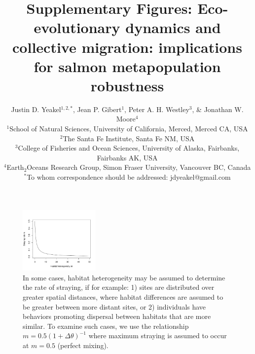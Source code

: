 \documentclass{revtex4}
\newcommand{\beginsupplement}{%
        \clearpage
        \setcounter{table}{0}
        \renewcommand{\thetable}{S\arabic{table}}%
        \setcounter{figure}{0}
        \renewcommand{\thefigure}{S\arabic{figure}}%
     }
\begin{document}
\title{Supplementary Figures: Eco-evolutionary dynamics and collective migration: implications for salmon metapopulation robustness}
\author{
Justin D. Yeakel${}^{1,2,*}$, Jean P. Gibert${}^{1}$, Peter A. H. Westley${}^{3}$, \& Jonathan W. Moore${}^{4}$ \\
${}^1$School of Natural Sciences, University of California, Merced, Merced CA, USA \\
${}^2$The Santa Fe Institute, Santa Fe NM, USA \\
${}^3$College of Fisheries and Ocean Sciences, University of Alaska, Fairbanks, Fairbanks AK, USA \\
${}^4$Earth${}_2$Oceans Research Group, Simon Fraser University, Vancouver BC, Canada \\
${}^*$To whom correspondence should be addressed: jdyeakel@gmail.com
}

\maketitle

\beginsupplement




\begin{figure}
  \captionsetup{justification=raggedright,
singlelinecheck=false
}
\centering
\includegraphics[width=0.35\textwidth]{fig_mthetarelation.pdf}
\caption{
In some cases, habitat heterogeneity may be assumed to determine the rate of straying, if for example:
1) sites are distributed over greater spatial distances, where habitat differences are assumed to be greater between more distant sites, or 2) individuals have behaviors promoting dispersal between habitats that are more similar. To examine such cases, we use the relationship $m= 0.5(1 + \Delta\theta)^{-1}$ where maximum straying is assumed to occur at $m=0.5$ (perfect mixing).
} \label{fig:mthetarelation}
\end{figure}
\end{document}
